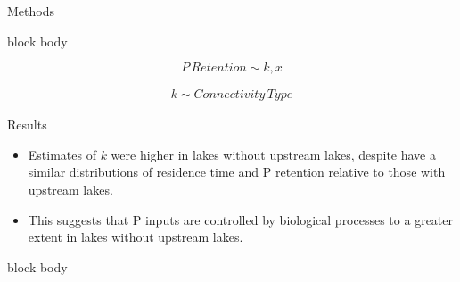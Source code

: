 \documentclass[final,hyperref={pdfpagelabels=false}]{beamer}
\begin{document}
\begin{frame}[t]
\begin{columns}[t]
\begin{column}{.465\textwidth}
\begin{block}{Methods}
\end{block}

{
\begin{beamercolorbox}[wd=\textwidth,rounded=true]{block body}

\begin{equation*}
P\, Retention \sim k, x
\end{equation*}

\begin{equation*}
\begin{split}
k \sim Connectivity\, Type
\end{split}
\end{equation*}

\end{beamercolorbox}
}

\vspace{1em}

\begin{block}{Results}
\begin{itemize}
\item Estimates of $k$ were higher in lakes without upstream lakes, despite have a similar distributions of residence time and P retention relative to those with upstream lakes.
\vspace{1em}
\item This suggests that P inputs are controlled by biological processes to a greater extent in lakes without upstream lakes.
\end{itemize}
\end{block}

{
\begin{beamercolorbox}[wd=\textwidth,rounded=true]{block body}


\end{beamercolorbox}}
\end{column}
\end{columns}
\end{frame}
\end{document}
